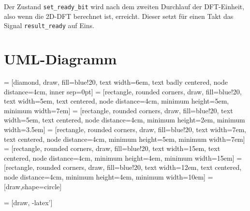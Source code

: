 Der Zustand \texttt{set\_ready\_bit} wird nach dem zweiten Durchlauf der DFT-Einheit, also wenn die 2D-DFT berechnet ist, erreicht. Dieser setzt für einen Takt
das Signal \texttt{result\_ready} auf Eins.

\section{UML-Diagramm}\label{sec:UML-Diagramm}

 = [diamond,                    draw, fill=blue!20, text width=6em, text badly centered, node distance=4cm, inner sep=0pt]
 =    [rectangle, rounded corners, draw, fill=blue!20, text width=5em, text centered,       node distance=4cm, minimum height=5em, minimum width=7em]
 =    [rectangle, rounded corners, draw, fill=blue!20, text width=5em, text centered,       node distance=4cm, minimum height=2em, minimum width=3.5em]
 =    [rectangle, rounded corners, draw, fill=blue!20, text width=7em, text centered,       node distance=4cm, minimum height=5em, minimum width=7em]
 =    [rectangle, rounded corners, draw, fill=blue!20, text width=15em, text centered,       node distance=4cm, minimum height=4em, minimum width=15em]
 =    [rectangle, rounded corners, draw, fill=blue!20, text width=12em, text centered,       node distance=4cm, minimum height=4em, minimum width=10em]
=[draw,shape=circle]

 = [draw, -latex']


